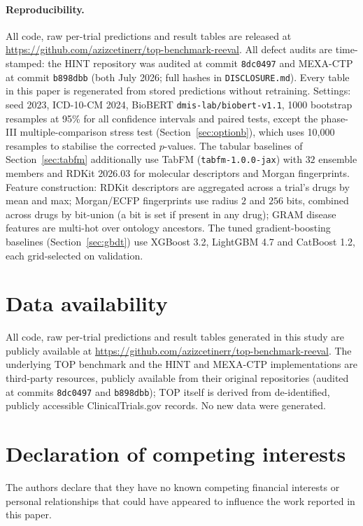 \documentclass[a4paper,fleqn]{cas-sc}
\begin{document}
\paragraph{Reproducibility.} All code, raw per-trial predictions and result tables are released at \url{https://github.com/azizcetinerr/top-benchmark-reeval}. All defect audits are time-stamped: the HINT repository was audited at commit \texttt{8dc0497} and MEXA-CTP at commit \texttt{b898dbb} (both July 2026; full hashes in \texttt{DISCLOSURE.md}). Every table in this paper is regenerated from stored predictions without retraining. Settings: seed 2023, ICD-10-CM 2024, BioBERT \texttt{dmis-lab/biobert-v1.1}, 1000 bootstrap resamples at 95\% for all confidence intervals and paired tests, except the phase-III multiple-comparison stress test (Section~\ref{sec:optionb}), which uses 10{,}000 resamples to stabilise the corrected $p$-values. The tabular baselines of Section~\ref{sec:tabfm} additionally use TabFM (\texttt{tabfm-1.0.0-jax}) with $32$ ensemble members and RDKit 2026.03 for molecular descriptors and Morgan fingerprints. Feature construction: RDKit descriptors are aggregated across a trial's drugs by mean and max; Morgan/ECFP fingerprints use radius $2$ and $256$ bits, combined across drugs by bit-union (a bit is set if present in any drug); GRAM disease features are multi-hot over ontology ancestors. The tuned gradient-boosting baselines (Section~\ref{sec:gbdt}) use XGBoost 3.2, LightGBM 4.7 and CatBoost 1.2, each grid-selected on validation.
\section*{Data availability}
All code, raw per-trial predictions and result tables generated in this study are publicly available at \url{https://github.com/azizcetinerr/top-benchmark-reeval}. The underlying TOP benchmark and the HINT and MEXA-CTP implementations are third-party resources, publicly available from their original repositories (audited at commits \texttt{8dc0497} and \texttt{b898dbb}); TOP itself is derived from de-identified, publicly accessible ClinicalTrials.gov records. No new data were generated.

\section*{Declaration of competing interests}
The authors declare that they have no known competing financial interests or personal relationships that could have appeared to influence the work reported in this paper.
\end{document}
